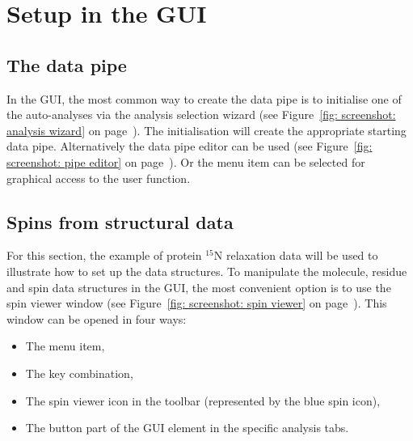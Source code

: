 
\section{Setup in the GUI}



\subsection{The data pipe} \label{sect: GUI - data pipe}

In the GUI, the most common way to create the data pipe is to initialise one of the auto-analyses via the analysis selection wizard (see Figure~\ref{fig: screenshot: analysis wizard} on page~\pageref{fig: screenshot: analysis wizard}).  The initialisation will create the appropriate starting data pipe.  Alternatively the data pipe editor can be used (see Figure~\ref{fig: screenshot: pipe editor} on page~\pageref{fig: screenshot: pipe editor}).  Or the  menu item can be selected for graphical access to the  user function.




\subsection{Spins from structural data} \label{sect: GUI - structural data}

For this section, the example of protein $^{15}$N relaxation data will be used to illustrate how to set up the data structures.  To manipulate the molecule, residue and spin data structures in the GUI, the most convenient option is to use the spin viewer window (see Figure~\ref{fig: screenshot: spin viewer} on page~\pageref{fig: screenshot: spin viewer}).  This window can be opened in four ways:

\begin{itemize}
\item The  menu item,
\item The  key combination,
\item The spin viewer icon in the toolbar (represented by the blue spin icon),
\item The  button part of the  GUI element in the specific analysis tabs.
\end{itemize}

